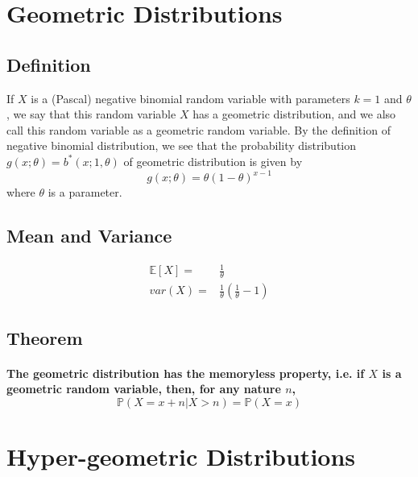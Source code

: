 \documentclass[titlepage]{article}
\begin{document}
    \section{Geometric Distributions}
        \subsection*{Definition}
            If $X$ is a (Pascal) negative binomial random variable with parameters $k=1$ and $\theta$, we say that this random variable $X$ has a geometric distribution, and we also call this random variable as a geometric random variable. By the definition of negative binomial distribution, we see that the probability distribution $g(x;\theta)=b^*(x;1,\theta)$ of geometric distribution is given by 
            $$g(x;\theta)=\theta(1-\theta)^{x-1}$$
            where $\theta$ is a parameter.
        \subsection*{Mean and Variance}
            \begin{equation*}
                \begin{split}
                    \mathbb{E}[X]=&\frac{1}{\theta}\\
                    var(X)=&\frac{1}{\theta}(\frac{1}{\theta}-1)
                \end{split}
            \end{equation*}

        \subsection*{Theorem}
            \paragraph{
                The geometric distribution has the memoryless property, i.e. if $X$ is a geometric random variable, then, for any nature $n$,
                $$\mathbb{P}(X=x+n|X>n)=\mathbb{P}(X=x)$$
            }
    \section{Hyper-geometric Distributions}
\end{document}

